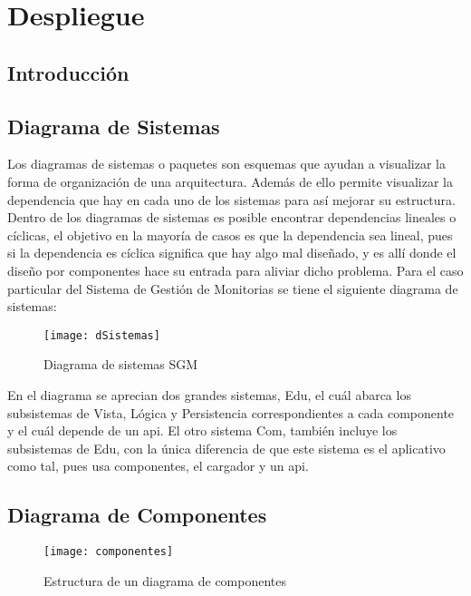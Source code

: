 
\chapter{Despliegue}

\section{Introducción}

\newpage

\section{Diagrama de Sistemas}

Los diagramas de sistemas o paquetes son esquemas que ayudan a visualizar la forma de organización de una arquitectura. Además de ello permite visualizar la dependencia que hay en cada uno de los sistemas para así mejorar su estructura. Dentro de los diagramas de sistemas es posible encontrar dependencias lineales o cíclicas, el objetivo en la mayoría de casos es que la dependencia sea lineal, pues si la dependencia es cíclica significa que hay algo mal diseñado, y es allí donde el diseño por componentes hace su entrada para aliviar dicho problema. 
Para el caso particular del Sistema de Gestión de Monitorias se tiene el siguiente diagrama de sistemas:

\begin{figure}[H]
	\centering
	\texttt{[image: dSistemas]}
	\centering
	\caption{Diagrama de sistemas SGM}
	\label{fig:dSistemas}
\end{figure}

En el diagrama se aprecian dos grandes sistemas, Edu, el cuál abarca los subsistemas de Vista, Lógica y Persistencia correspondientes a cada componente y el cuál depende de un api. El otro sistema Com, también incluye los subsistemas de Edu, con la única diferencia de que este sistema es el aplicativo como tal, pues usa componentes, el cargador y un api.

\newpage

\section{Diagrama de Componentes}
\begin{figure}[H]
	\centering
	\texttt{[image: componentes]}
	\centering
	\caption{Estructura de un diagrama de componentes}
	\label{fig:componentes}
\end{figure}

